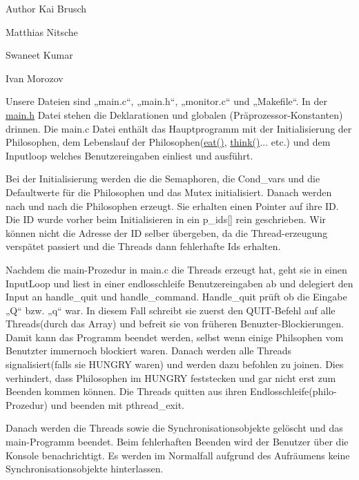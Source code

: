 \begin{DoxyAuthor}{Author}
Kai Brusch 

Matthias Nitsche 

Swaneet Kumar 

Ivan Morozov
\end{DoxyAuthor}


Unsere Dateien sind „main.\-c“, „main.\-h“, „monitor.\-c“ und „\-Makefile“. In der \hyperlink{main_8h}{main.\-h} Datei stehen die Deklarationen und globalen (Präprozessor-\/\-Konstanten) drinnen. Die main.\-c Datei enthält das Hauptprogramm mit der Initialisierung der Philosophen, dem Lebenslauf der Philosophen(\hyperlink{main_8h_a0c8c51d90769a1116cdadde466de49fd}{eat()}, \hyperlink{main_8h_af9aa51f8b26299354cf18d7c43276fdb}{think()}... etc.) und dem Inputloop welches Benutzereingaben einliest und ausführt.

Bei der Initialisierung werden die die Semaphoren, die Cond\-\_\-vars und die Defaultwerte für die Philosophen und das Mutex initialisiert. Danach werden nach und nach die Philosophen erzeugt. Sie erhalten einen Pointer auf ihre I\-D. Die I\-D wurde vorher beim Initialisieren in ein p\-\_\-ids\mbox{[}\mbox{]} rein geschrieben. Wir können nicht die Adresse der I\-D selber übergeben, da die Thread-\/erzeugung verspätet passiert und die Threads dann fehlerhafte Ids erhalten. 

Nachdem die main-\/\-Prozedur in main.\-c die Threads erzeugt hat, geht sie in einen Input\-Loop und liest in einer endlosschleife Benutzereingaben ab und delegiert den Input an handle\-\_\-quit und handle\-\_\-command. Handle\-\_\-quit prüft ob die Eingabe „\-Q“ bzw. „q“ war. In diesem Fall schreibt sie zuerst den Q\-U\-I\-T-\/\-Befehl auf alle Threads(durch das Array) und befreit sie von früheren Benuzter-\/\-Blockierungen. Damit kann das Programm beendet werden, selbst wenn einige Philsophen vom Benutzter immernoch blockiert waren. Danach werden alle Threads signalisiert(falls sie H\-U\-N\-G\-R\-Y waren) und werden dazu befohlen zu joinen. Dies verhindert, dass Philosophen im H\-U\-N\-G\-R\-Y feststecken und gar nicht erst zum Beenden kommen können. Die Threads quitten aus ihren Endlosschleife(philo-\/\-Prozedur) und beenden mit pthread\-\_\-exit.

Danach werden die Threads sowie die Synchronisationsobjekte gelöscht und das main-\/\-Programm beendet. Beim fehlerhaften Beenden wird der Benutzer über die Konsole benachrichtigt. Es werden im Normalfall aufgrund des Aufräumens keine Synchronisationsobjekte hinterlassen.

